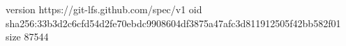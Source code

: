 version https://git-lfs.github.com/spec/v1
oid sha256:33b3d2c6cfd54d2fe70ebdc9908604df3875a47afc3d811912505f42bb582f01
size 87544
